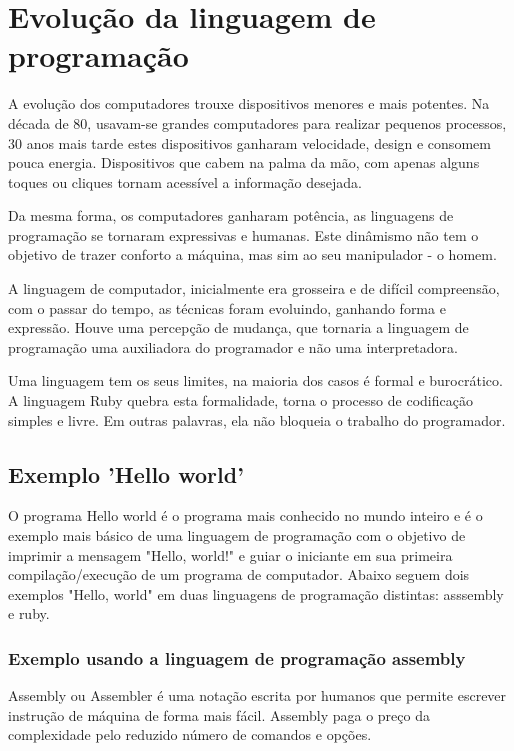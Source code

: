 \documentclass[espaco=simples,appendix=Name]{abnt}
\begin{document}
\chapter{Evolução da linguagem de programação}

A evolução dos computadores trouxe dispositivos menores e mais potentes. Na década de 80, usavam-se grandes computadores para realizar pequenos processos, 30 anos mais tarde estes dispositivos ganharam velocidade, design e consomem pouca energia. Dispositivos que cabem na palma da mão, com apenas alguns toques ou cliques tornam acessível a informação desejada. 

Da mesma forma, os computadores ganharam potência, as linguagens de programação se tornaram expressivas e humanas. Este dinâmismo não tem o objetivo de trazer conforto a máquina, mas sim ao seu manipulador - o homem. 

A linguagem de computador, inicialmente era grosseira e de difícil compreensão, com o passar do tempo, as técnicas foram evoluindo, ganhando forma e expressão. Houve uma percepção de mudança, que tornaria a linguagem de programação uma auxiliadora do programador e não uma interpretadora.

Uma linguagem tem os seus limites, na maioria dos casos é formal e burocrático. A linguagem Ruby quebra esta formalidade, torna o processo de codificação simples e livre. Em outras palavras, ela não bloqueia o trabalho do programador.

\section{Exemplo 'Hello world'}

   O programa Hello world é o programa mais conhecido no mundo inteiro e é o exemplo mais básico de uma linguagem de programação com o objetivo de imprimir a mensagem "Hello, world!" e guiar o iniciante em sua primeira compilação/execução de um programa de computador. Abaixo seguem dois exemplos "Hello, world" em duas linguagens de programação distintas: asssembly e ruby.


\subsection {Exemplo usando a linguagem de programação assembly}

Assembly ou Assembler é uma notação escrita por humanos que permite escrever instrução de máquina de forma mais fácil. Assembly paga o preço da complexidade pelo reduzido número de comandos e opções.
\end{document}
